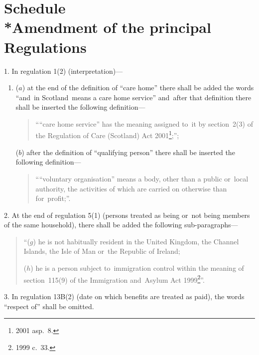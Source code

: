 \documentclass[12pt,a4paper]{article}
\begin{document}
\small

\part[Schedule --- Amendment of the principal Regulations]{Schedule\\*Amendment of the principal Regulations}

\renewcommand\parthead{--- Schedule}

1.  In regulation 1(2) (interpretation)—
\begin{enumerate}\item[]
($a$) at the end of the definition of “care home” there shall be added the words “and~in Scotland~means a care home service” and~after that definition there shall be inserted the following definition—
\begin{quotation}
““care home service” has the meaning assigned to~it by section~2(3) of the Regulation of Care (Scotland) Act 2001\footnote{2001 asp.~8.};”;
\end{quotation}

($b$) after the definition of “qualifying person” there shall be inserted the following definition—
\begin{quotation}
““voluntary organisation” means a body, other than a public or~local authority, the activities of which are carried on otherwise than for~profit;”.
\end{quotation}
\end{enumerate}

\medskip

2.  At the end of regulation 5(1) (persons treated as being or~not being members of the same household), there shall be added the following sub-paragraphs—
\begin{quotation}
“($g$) he is not habitually resident in the United Kingdom, the Channel Islands, the Isle of Man or~the Republic of Ireland;

($h$) he is a person subject to~immigration control within the meaning of section~115(9) of the Immigration and~Asylum Act 1999\footnote{1999 c.~33.}”.
\end{quotation}

\medskip

3.  In regulation 13B(2) (date on which benefits are treated as paid), the words “respect of” shall be omitted.

\medskip
\end{document}
